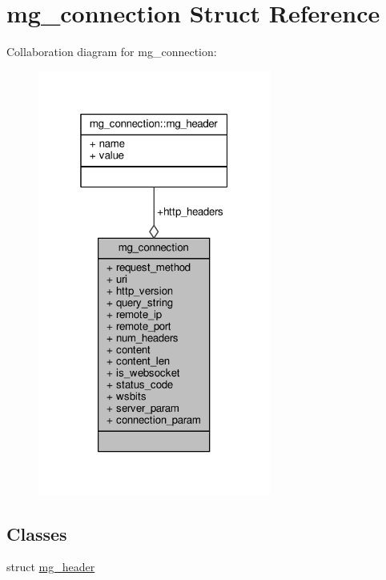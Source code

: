\hypertarget{structmg__connection}{}\section{mg\+\_\+connection Struct Reference}
\label{structmg__connection}


Collaboration diagram for mg\+\_\+connection\+:
\nopagebreak
\begin{figure}[H]
\begin{center}
\leavevmode
\includegraphics[width=217pt]{d2/d11/structmg__connection__coll__graph}
\end{center}
\end{figure}
\subsection*{Classes}
\begin{DoxyCompactItemize}
\item 
struct \hyperlink{structmg__connection_1_1mg__header}{mg\+\_\+header}
\end{DoxyCompactItemize}
